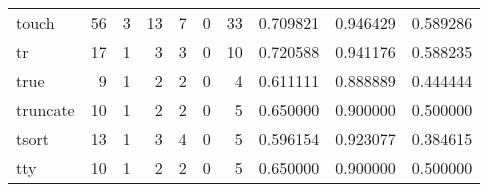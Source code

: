 \begin{tabular}{lrrrrrrrrr}
touch     &                                      56 &                                                  3 &                                                 13 &                                                  7 &                                                  0 &                                                 33 &                                           0.709821 &                               0.946429 &                             0.589286 \\
tr        &                                      17 &                                                  1 &                                                  3 &                                                  3 &                                                  0 &                                                 10 &                                           0.720588 &                               0.941176 &                             0.588235 \\
true      &                                       9 &                                                  1 &                                                  2 &                                                  2 &                                                  0 &                                                  4 &                                           0.611111 &                               0.888889 &                             0.444444 \\
truncate  &                                      10 &                                                  1 &                                                  2 &                                                  2 &                                                  0 &                                                  5 &                                           0.650000 &                               0.900000 &                             0.500000 \\
tsort     &                                      13 &                                                  1 &                                                  3 &                                                  4 &                                                  0 &                                                  5 &                                           0.596154 &                               0.923077 &                             0.384615 \\
tty       &                                      10 &                                                  1 &                                                  2 &                                                  2 &                                                  0 &                                                  5 &                                           0.650000 &                               0.900000 &                             0.500000 \\

\end{tabular}
